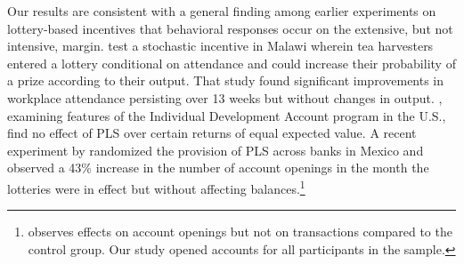 \documentclass[11pt]{article}
\begin{document}




		Our results are consistent with a general finding among earlier experiments on lottery-based incentives that behavioral responses occur on the extensive, but not intensive, margin. \textcite{brune_effect_2015} test a stochastic incentive in Malawi wherein tea harvesters entered a lottery conditional on attendance and could increase their probability of a prize according to their output. That study found significant improvements in workplace attendance persisting over 13 weeks but without changes in output. \textcite{loibl_testing_2016}, examining features of the Individual Development Account program in the U.S., find no effect of PLS over certain returns of equal expected value. A recent experiment by \textcite{gertler_long-term_2017} randomized the provision of PLS across banks in Mexico and observed a 43\% increase in the number of account openings in the month the lotteries were in effect but without affecting balances.\footnote{\textcite{gertler_long-term_2017} observes effects on account openings but not on transactions compared to the control group. Our study opened accounts for all participants in the sample.}
\end{document}
